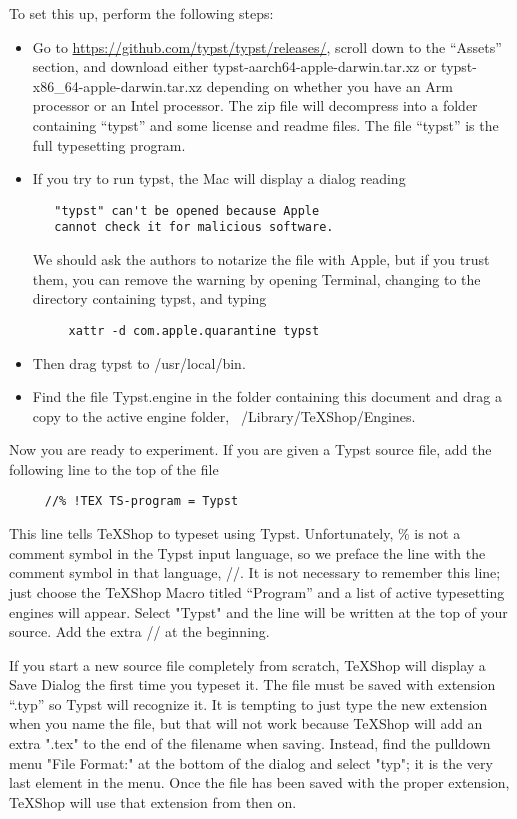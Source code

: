 \documentclass[11pt, oneside]{article}   	%
\begin{document}
To set this up, perform the following steps:
\begin{itemize}
\item Go to  \url{https://github.com/typst/typst/releases/}, scroll down to the ``Assets'' section, and download either typst-aarch64-apple-darwin.tar.xz or typst-x86\_64-apple-darwin.tar.xz depending on whether you have an Arm processor or an Intel processor. The zip file will decompress into a folder containing  ``typst'' and some license and readme files. The file ``typst'' is the full typesetting program.
\item
If you try to run typst, the Mac will display a dialog reading
\begin{verbatim}
   "typst" can't be opened because Apple 
   cannot check it for malicious software.
\end{verbatim}
We should ask the authors to notarize the file with Apple, but if you trust them, you can remove the
warning by opening Terminal, changing to the directory containing typst, and typing
\begin{verbatim}
     xattr -d com.apple.quarantine typst
\end{verbatim}
\item Then drag typst to /usr/local/bin.
\item Find the file Typst.engine in the folder containing this document 
and drag a copy to the active engine folder, ~/Library/TeXShop/Engines.
\end{itemize}
\vspace{.2 in}

Now you are ready to experiment. If you are given a Typst source file, add the following line to the top of the file
\begin{verbatim}
     //% !TEX TS-program = Typst
\end{verbatim}
This line tells TeXShop to typeset using Typst. Unfortunately, \% is not a comment symbol in the Typst input language, so we preface the line with the comment symbol in that language, //. It is not necessary to remember this line; just
choose the TeXShop Macro titled  ``Program'' and a list of active typesetting engines will appear. Select "Typst" and
the line will be written at the top of your source. Add the extra // at the beginning.

If  you start a new source file completely from scratch,  TeXShop will display a Save Dialog the first time you typeset it. The file must be saved with extension ``.typ'' so Typst will recognize it.  It is tempting to just type the new extension when you name the file, but that will not work because TeXShop will add an extra ".tex" to the end of the filename when saving. Instead, find the pulldown menu "File Format:" at the bottom of the dialog and select "typ"; it is the very last element in the menu. Once the file has been saved with the proper extension, TeXShop will use that extension from then on. 
\end{document}

